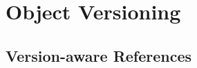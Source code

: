 


\chapter{Object Versioning} \label{chapter:APPROACH}

% 
% 


\section{Version-aware References} \label{sec:APPROACH:1}

